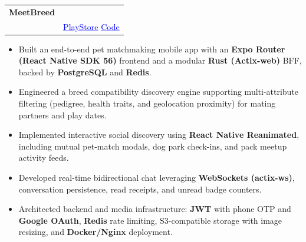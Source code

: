 \documentclass[a4paper,11pt]{article}
\makeatletter
\newcommand{\resumeProjectHeading}[4]{
\vspace{0.5mm}
    \item[]
    \begin{tabular*}{0.98\textwidth}[t]{l@{\extracolsep{\fill}}r}
        \textbf{#1} & \textit{\footnotesize{#2}} \\
        \textit{\footnotesize{#3}} & \footnotesize{#4}
    \end{tabular*}
    \vspace{-2.4mm}
}
\providecommand{\faGooglePlay}{\faExternalLink*}
\newcommand{\resumeProjectLinksPlayStore}[2]{
    \footnotesize{
        \href{#1}{\textcolor{blue}{\underline{\faGooglePlay{} PlayStore}}} \hspace{1mm}
        \href{#2}{\textcolor{blue}{\underline{\faCode{} Code}}}
    }
}
\newcommand{\resumeItemListStart}{\begin{justify}\begin{itemize}[leftmargin=3ex, rightmargin=2ex, noitemsep,labelsep=1.2mm,itemsep=0mm]\small}
\newcommand{\resumeItemListEnd}{\end{itemize}\end{justify}\vspace{-2mm}}
\makeatother
\begin{document}
    \resumeProjectHeading
        {MeetBreed}{} 
    {\parbox[t]{0.7\linewidth}{A pet discovery and breeding partner matchmaking mobile platform featuring pedigree filtering, mutual matching, and real-time chat.}}{
        \resumeProjectLinksPlayStore{https://play.google.com/store/apps/details?id=com.kraftisium.meetbreed}{https://github.com/itsarraj/meetbreed}
        }
    \resumeItemListStart
        \item {Built an end-to-end pet matchmaking mobile app with an \textbf{Expo Router (React Native SDK 56)} frontend and a modular \textbf{Rust (Actix-web)} BFF, backed by \textbf{PostgreSQL} and \textbf{Redis}.}
        \item {Engineered a breed compatibility discovery engine supporting multi-attribute filtering (pedigree, health traits, and geolocation proximity) for mating partners and play dates.}
        \item {Implemented interactive social discovery using \textbf{React Native Reanimated}, including mutual pet-match modals, dog park check-ins, and pack meetup activity feeds.}
        \item {Developed real-time bidirectional chat leveraging \textbf{WebSockets (actix-ws)}, conversation persistence, read receipts, and unread badge counters.}
        \item {Architected backend and media infrastructure: \textbf{JWT} with phone OTP and \textbf{Google OAuth}, \textbf{Redis} rate limiting, S3-compatible storage with image resizing, and \textbf{Docker/Nginx} deployment.}
    \resumeItemListEnd
    \vspace{-2mm}
\end{document}
